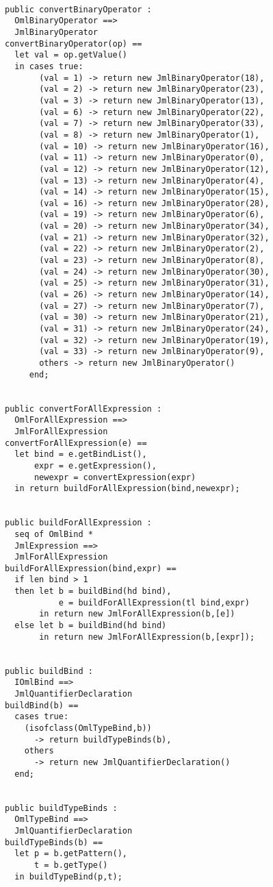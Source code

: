 \begin{lstlisting}
  
public convertBinaryOperator :
  OmlBinaryOperator ==>
  JmlBinaryOperator
convertBinaryOperator(op) ==
  let val = op.getValue()
  in cases true:
       (val = 1) -> return new JmlBinaryOperator(18),
	   (val = 2) -> return new JmlBinaryOperator(23),
	   (val = 3) -> return new JmlBinaryOperator(13),
	   (val = 6) -> return new JmlBinaryOperator(22),
	   (val = 7) -> return new JmlBinaryOperator(33),
	   (val = 8) -> return new JmlBinaryOperator(1),
	   (val = 10) -> return new JmlBinaryOperator(16),
	   (val = 11) -> return new JmlBinaryOperator(0),
	   (val = 12) -> return new JmlBinaryOperator(12),
	   (val = 13) -> return new JmlBinaryOperator(4),
	   (val = 14) -> return new JmlBinaryOperator(15),
	   (val = 16) -> return new JmlBinaryOperator(28),
	   (val = 19) -> return new JmlBinaryOperator(6),
	   (val = 20) -> return new JmlBinaryOperator(34),
	   (val = 21) -> return new JmlBinaryOperator(32),
	   (val = 22) -> return new JmlBinaryOperator(2),
	   (val = 23) -> return new JmlBinaryOperator(8),
	   (val = 24) -> return new JmlBinaryOperator(30),
	   (val = 25) -> return new JmlBinaryOperator(31),
	   (val = 26) -> return new JmlBinaryOperator(14),
	   (val = 27) -> return new JmlBinaryOperator(7),
	   (val = 30) -> return new JmlBinaryOperator(21),
	   (val = 31) -> return new JmlBinaryOperator(24),
	   (val = 32) -> return new JmlBinaryOperator(19),
	   (val = 33) -> return new JmlBinaryOperator(9),
	   others -> return new JmlBinaryOperator()
     end;
  
  
public convertForAllExpression :
  OmlForAllExpression ==>
  JmlForAllExpression
convertForAllExpression(e) ==
  let bind = e.getBindList(),
      expr = e.getExpression(),
	  newexpr = convertExpression(expr)
  in return buildForAllExpression(bind,newexpr);
  
  
public buildForAllExpression :
  seq of OmlBind * 
  JmlExpression ==>
  JmlForAllExpression
buildForAllExpression(bind,expr) ==
  if len bind > 1
  then let b = buildBind(hd bind),
	       e = buildForAllExpression(tl bind,expr)
	   in return new JmlForAllExpression(b,[e])
  else let b = buildBind(hd bind)
       in return new JmlForAllExpression(b,[expr]);
  
  
public buildBind :
  IOmlBind ==>
  JmlQuantifierDeclaration
buildBind(b) == 
  cases true:
    (isofclass(OmlTypeBind,b))
	  -> return buildTypeBinds(b),
	others 
	  -> return new JmlQuantifierDeclaration()
  end;
  
  
public buildTypeBinds :
  OmlTypeBind ==>
  JmlQuantifierDeclaration
buildTypeBinds(b) == 
  let p = b.getPattern(),
      t = b.getType()
  in buildTypeBind(p,t);
  

\end{lstlisting}
